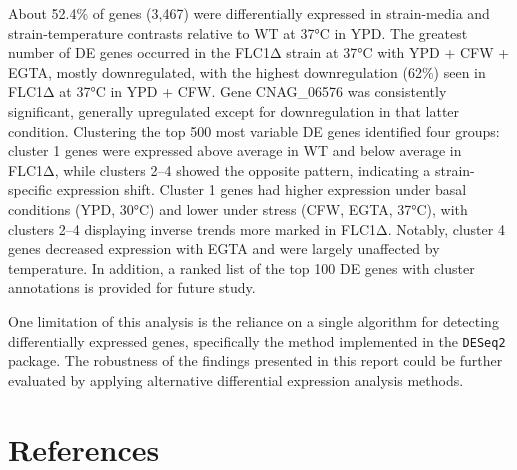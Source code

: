 \documentclass[
  a4paper,
]{scrreprt}
\begin{document}
About 52.4\% of genes (3,467) were differentially expressed in
strain-media and strain-temperature contrasts relative to WT at 37°C in
YPD. The greatest number of DE genes occurred in the FLC1Δ strain at
37°C with YPD + CFW + EGTA, mostly downregulated, with the highest
downregulation (62\%) seen in FLC1Δ at 37°C in YPD + CFW. Gene
CNAG\_06576 was consistently significant, generally upregulated except
for downregulation in that latter condition. Clustering the top 500 most
variable DE genes identified four groups: cluster 1 genes were expressed
above average in WT and below average in FLC1Δ, while clusters 2--4
showed the opposite pattern, indicating a strain-specific expression
shift. Cluster 1 genes had higher expression under basal conditions
(YPD, 30°C) and lower under stress (CFW, EGTA, 37°C), with clusters 2--4
displaying inverse trends more marked in FLC1Δ. Notably, cluster 4 genes
decreased expression with EGTA and were largely unaffected by
temperature. In addition, a ranked list of the top 100 DE genes with
cluster annotations is provided for future study.

One limitation of this analysis is the reliance on a single algorithm
for detecting differentially expressed genes, specifically the method
implemented in the \texttt{DESeq2} package. The robustness of the
findings presented in this report could be further evaluated by applying
alternative differential expression analysis methods.


\chapter*{References}\label{references}

\end{document}
